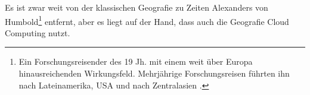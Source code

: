 Es ist zwar weit von der klassischen Geografie zu Zeiten Alexanders von Humbold\footnote{Ein Forschungsreisender des 19 Jh. mit einem weit über Europa hinausreichenden Wirkungsfeld. Mehrjährige Forschungsreisen führten ihn nach Lateinamerika, USA und nach Zentralasien \cite{Kehlmann2005}.} entfernt, aber es liegt auf der Hand, dass auch die Geografie Cloud Computing nutzt.
